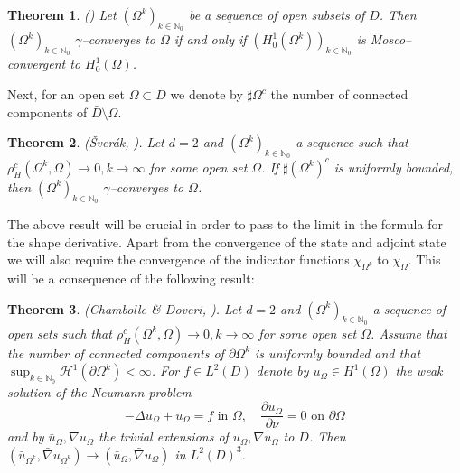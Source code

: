 \documentclass[a4paper,10pt]{article}
\theoremstyle{plain}
\newtheorem{thm}{Theorem}[section]
\theoremstyle{plain}
\numberwithin{equation}{section}
\begin{document}
\begin{thm} \label{gM}  (\cite[Proposition 3.5.5]{HenPie18}) Let $(\Omega^k)_{k \in \mathbb N_0}$ be
a sequence of open subsets of $D$. Then $(\Omega^k)_{k \in \mathbb N_0}$ $\gamma$--converges to $\Omega$
if and only if $(H^1_0(\Omega^k))_{k \in \mathbb N_0}$ is Mosco--convergent to $H^1_0(\Omega)$.
\end{thm}

\noindent
Next, for an open set $\Omega \subset D$
we denote by $\sharp \Omega^c$ the number of connected components of $\bar D \setminus \Omega$. 

\begin{thm} \label{sv} ({\v{S}}ver{\'a}k, \cite{vsverak1993optimal}). Let $d=2$ and $(\Omega^k)_{k \in \mathbb N_0}$ a sequence  such that $\rho_H^c(\Omega^k,\Omega) \rightarrow 0, k \rightarrow \infty$ for some open set $\Omega$. If  
$\sharp (\Omega^k)^c$ is uniformly bounded, then $(\Omega^k)_{k \in \mathbb N_0}$ $\gamma$--converges to $\Omega$.
\end{thm}


\vspace{2mm} 
The above result will be crucial in order to pass to the limit
in the formula for the shape derivative. Apart from the convergence
of the state and adjoint state we will also require the
convergence of the indicator functions $\chi_{\Omega^k}$ to $\chi_{\Omega}$. This will be a consequence of the following
result:

\begin{thm} \label{cd} (Chambolle \& Doveri, \cite{ChamDov97}). Let $d=2$ and $(\Omega^k)_{k \in \mathbb N_0}$ a sequence of open sets such that $\rho_H^c(\Omega^k,\Omega) \rightarrow 0, k \rightarrow \infty$ for some open set $\Omega$. Assume that the number of connected components of $\partial \Omega^k$ is uniformly bounded and that  $\sup_{k \in \mathbb N_0} \mathcal H^1(\partial \Omega^k)<\infty$. For $f \in L^2(D)$ denote by $u_\Omega \in H^1(\Omega)$ the weak solution of the Neumann problem 
\begin{displaymath}
    -\Delta u_\Omega + u_\Omega = f \mbox{ in } \Omega, \quad  \frac{\partial u_\Omega}{\partial \nu} =0 \mbox{ on } 
    \partial \Omega
\end{displaymath}
and by $\bar u_\Omega, \bar \nabla u_\Omega$ the trivial extensions of $u_\Omega, \nabla u_\Omega$
to $D$. Then $(\bar u_{\Omega^k},\bar \nabla u_{\Omega^k})  \rightarrow (\bar u_{\Omega}, \bar \nabla u_{\Omega})$ in $L^2(D)^3$.
\end{thm}
\end{document}

